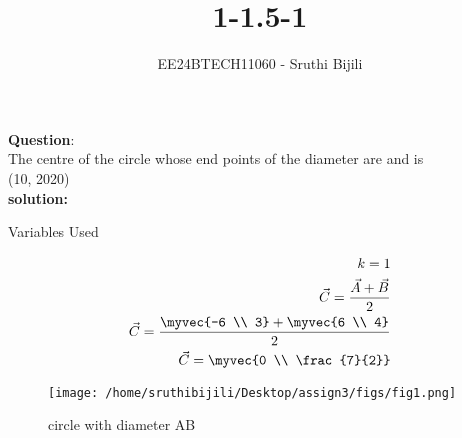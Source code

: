 \documentclass[journal]{IEEEtran}
\begin{document}

\vspace{3cm}

\title{1-1.5-1}
\author{EE24BTECH11060 - Sruthi Bijili}
{\let\newpage\relax\maketitle}

\renewcommand{\thefigure}{\theenumi}
\renewcommand{\thetable}{\theenumi}
\setlength{\intextsep}{10pt} %


\renewcommand{\thetable}{\theenumi}

\textbf{Question}:\\
The centre of the circle whose end points of the diameter are  and  is \\

\hfill(10, 2020)
\\
\textbf{solution:}
\begin{table}[h!]    
  \centering
  
  \caption{Variables Used}
  \label{tab1.1.5.1.1}
\end{table}
\begin{align*}
k =1\\
\Vec{C}=\frac{\Vec{A}+\Vec{B}}{2}\\
\Vec{C} =\frac{\myvec{-6 \\ 3}+\myvec{6 \\ 4}}{2}\\
\Vec{C}=\myvec{0 \\ \frac{7}{2}}
\end{align*}
\begin{figure}[h!]
   \centering
   \texttt{[image: /home/sruthibijili/Desktop/assign3/figs/fig1.png]}
   \caption{circle with diameter AB}
\end{figure}


    
\end{document}
